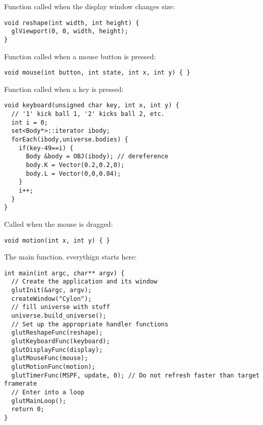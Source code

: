 \noindent
Function called when the display window changes size: \begin{lstlisting}
void reshape(int width, int height) {
  glViewport(0, 0, width, height);
}
\end{lstlisting}
\noindent
Function called when a mouse button is pressed: \begin{lstlisting}
void mouse(int button, int state, int x, int y) { }
\end{lstlisting}
\noindent
Function called when a key is pressed: \begin{lstlisting}
void keyboard(unsigned char key, int x, int y) {
  // '1' kick ball 1, '2' kicks ball 2, etc.
  int i = 0;
  set<Body*>::iterator ibody;
  forEach(ibody,universe.bodies) {
    if(key-49==i) {
      Body &body = OBJ(ibody); // dereference
      body.K = Vector(0.2,0.2,0);
      body.L = Vector(0,0,0.04);
    }
    i++;
  }
}
\end{lstlisting}
\noindent
Called when the mouse is dragged: \begin{lstlisting}
void motion(int x, int y) { }
\end{lstlisting}
\noindent
The main function. everythign starts here: \begin{lstlisting}
int main(int argc, char** argv) {
  // Create the application and its window
  glutInit(&argc, argv);
  createWindow("Cylon");
  // fill universe with stuff
  universe.build_universe();
  // Set up the appropriate handler functions
  glutReshapeFunc(reshape);
  glutKeyboardFunc(keyboard);
  glutDisplayFunc(display);
  glutMouseFunc(mouse);
  glutMotionFunc(motion);
  glutTimerFunc(MSPF, update, 0); // Do not refresh faster than target framerate
  // Enter into a loop
  glutMainLoop();
  return 0;
}
\end{lstlisting}
